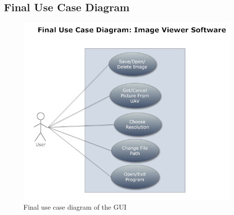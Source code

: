 \documentclass[oneside]{ecsgdp}         %
\begin{document}
\subsection{Final Use Case Diagram}
\begin{center}
\begin{figure}[!hbtp]
\includegraphics[scale=0.7]{FinaluserCase.PNG} 
\caption{Final use case diagram of the GUI\label{GUI_finalUseCase}}
\end{figure}
\end{center}
\end{document}
